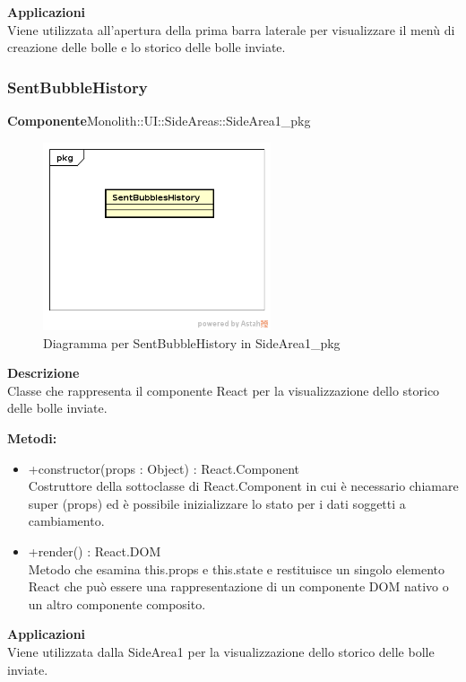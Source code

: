 \textbf{Applicazioni}\\
Viene utilizzata all'apertura della prima barra laterale per visualizzare il menù di creazione delle bolle e lo storico delle bolle inviate. 


\clearpage

\subsubsection{SentBubbleHistory}
\textbf{Componente}Monolith::UI::SideAreas::SideArea1\_pkg\\
   \FloatBarrier
   \begin{figure}[ht]
   \centering
   \includegraphics[width=0.6\textwidth]{img/single-SentBubbleHistory}
   \caption{{Diagramma per SentBubbleHistory in SideArea1\_pkg}}
\end{figure}
\FloatBarrier
\textbf{Descrizione}\\
Classe che rappresenta il componente React per la visualizzazione dello storico delle bolle inviate.

\textbf{Metodi:} \begin{itemize}\item +constructor(props : Object) : React.Component \\Costruttore della sottoclasse di React.Component in cui è necessario chiamare super (props) ed è possibile inizializzare lo stato per i dati soggetti a cambiamento.\item +render() : React.DOM \\Metodo che esamina this.props e this.state e restituisce un singolo elemento React che può essere una rappresentazione di un componente DOM nativo o un altro componente composito.\end{itemize} 


\textbf{Applicazioni}\\
Viene utilizzata dalla SideArea1 per la visualizzazione dello storico delle bolle inviate. 


